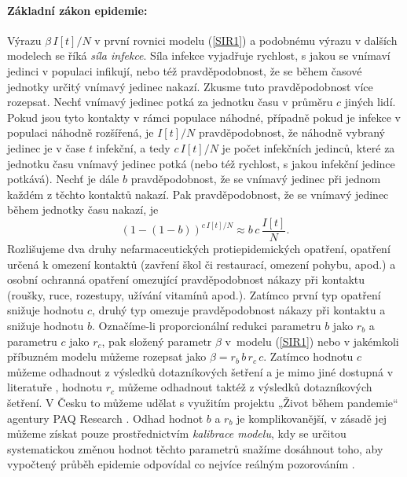 \paragraph{Základní zákon epidemie:} Výrazu $\beta\,I[t]/N$ v první rovnici modelu (\ref{SIR1}) a podobnému výrazu v dalších modelech se říká \emph{síla infekce}. Síla infekce vyjadřuje rychlost, s jakou se vnímaví jedinci v populaci infikují, nebo též pravděpodobnost, že se během časové jednotky určitý vnímavý jedinec nakazí. Zkusme tuto pravděpodobnost více rozepsat. Nechť vnímavý jedinec potká za jednotku času v průměru $c$ jiných lidí. Pokud jsou tyto kontakty v rámci populace náhodné, případně pokud je infekce v populaci náhodně rozšířená, je $I[t]/N$ pravděpodobnost, že náhodně vybraný jedinec je v čase $t$ infekční, a tedy $c\,I[t]/N$ je počet infekčních jedinců, které za jednotku času vnímavý jedinec potká (nebo též rychlost, s jakou infekční jedince potkává). Nechť je dále $b$ pravděpodobnost, že se vnímavý jedinec při jednom každém z těchto kontaktů nakazí. Pak pravděpodobnost, že se vnímavý jedinec během jednotky času nakazí, je 
\begin{equation}
(1-(1-b))^{c\,I[t]/N} \approx b\, c \, \frac{I[t]}{N}.
\end{equation}
Rozlišujeme dva druhy nefarmaceutických protiepidemických opatření, opatření určená k omezení kontaktů (zavření škol či restaurací, omezení pohybu, apod.) a osobní ochranná opatření omezující pravděpodobnost nákazy při kontaktu (roušky, ruce, rozestupy, užívání vitamínů apod.). Zatímco první typ opatření snižuje hodnotu $c$, druhý typ omezuje pravděpodobnost nákazy při kontaktu a snižuje hodnotu $b$. Označíme-li proporcionální redukci parametru $b$ jako $r_b$ a parametru $c$ jako $r_c$, pak složený parametr $\beta$ v~modelu (\ref{SIR1}) nebo v jakémkoli příbuzném modelu můžeme rozepsat jako $\beta = r_b\,b\,r_c\,c$. Zatímco hodnotu $c$ můžeme odhadnout z výsledků dotazníkových šetření a je mimo jiné dostupná v literatuře \cite{Prem_etal2017}, hodnotu $r_c$ můžeme odhadnout taktéž z výsledků dotazníkových šetření. V Česku to můžeme udělat s využitím projektu „Život během pandemie“ agentury PAQ Research \cite[\url{www.zivotbehempandemie.cz}]{paqcovid}. Odhad hodnot $b$ a $r_b$ je komplikovanější, v zásadě jej můžeme získat pouze prostřednictvím \emph{kalibrace modelu}, kdy se určitou systematickou změnou hodnot těchto parametrů snažíme dosáhnout toho, aby vypočtený průběh epidemie odpovídal co nejvíce reálným pozorováním \cite{Yang_etal2014,King_etal2016}. 

